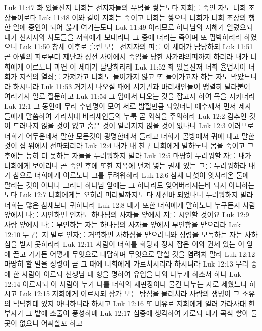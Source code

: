 Luk 11:47  화 있을진저 너희는 선지자들의 무덤을 쌓는도다 저희를 죽인 자도 너희 조상들이로다
Luk 11:48  이와 같이 저희는 죽이고 너희는 쌓으니 너희가 너희 조상의 행한 일에 증인이 되어 옳게 여기는도다
Luk 11:49  이러므로 하나님의 지혜가 일렀으되 내가 선지자와 사도들을 저희에게 보내리니 그 중에 더러는 죽이며 또 핍박하리라 하였으니
Luk 11:50  창세 이후로 흘린 모든 선지자의 피를 이 세대가 담당하되
Luk 11:51  곧 아벨의 피로부터 제단과 성전 사이에서 죽임을 당한 사가랴의피까지 하리라 내가 너희에게 이르노니 과연 이 세대가 담당하리라
Luk 11:52  화 있을진저 너희 율법사여 너희가 지식의 열쇠를 가져가고 너희도 들어가지 않고 또 들어가고자 하는 자도 막았느니라 하시니라
Luk 11:53  거기서 나오실 때에 서기관과 바리새인들이 맹렬히 달라붙어 여러가지 일로 힐문하고
Luk 11:54  그 입에서 나오는 것을 잡고자 하여 목을 지키더라
Luk 12:1  그 동안에 무리 수만명이 모여 서로 밟힐만큼 되었더니 예수께서 먼저 제자들에게 말씀하여 가라사대 바리새인들의 누룩 곧 외식을 주의하라
Luk 12:2  감추인 것이 드러나지 않을 것이 없고 숨은 것이 알려지지 않을 것이 없나니
Luk 12:3  이러므로 너희가 어두운데서 말한 모든것이 광명한데서 들리고 너희가 골방에서 귀에 대고 말한 것이 집 위에서 전파되리라
Luk 12:4  내가 내 친구 너희에게 말하노니 몸을 죽이고 그 후에는 능히 더 못하는 자들을 두려워하지 말라
Luk 12:5  마땅히 두려워할 자를 내가 너희에게 보이리니 곧 죽인 후에 또한 지옥에 던져 넣는 권세 있는 그를 두려워하라 내가 참으로 너희에게 이르노니 그를 두려워하라
Luk 12:6  참새 다섯이 앗사리온 둘에 팔리는 것이 아니냐 그러나 하나님 앞에는 그 하나라도 잊어버리시는바 되지 아니하는도다
Luk 12:7  너희에게는 오히려 머리털까지도 다 세신바 되었나니 두려워하지 말라 너희는 많은 참새보다 귀하니라
Luk 12:8  내가 또한 너희에게 말하노니 누구든지 사람 앞에서 나를 시인하면 인자도 하나님의 사자들 앞에서 저를 시인할 것이요
Luk 12:9  사람 앞에서 나를 부인하는 자는 하나님의 사자들 앞에서 부인함을 받으리라
Luk 12:10  누구든지 말로 인자를 거역하면 사하심을 받으려니와 성령을 모독하는 자는 사하심을 받지 못하리라
Luk 12:11  사람이 너희를 회당과 정사 잡은 이와 권세 있는 이 앞에 끌고 가거든 어떻게 무엇으로 대답하며 무엇으로 말할 것을 염려치 말라
Luk 12:12  마땅히 할 말을 성령이 곧 그 때에 너희에게 가르치시리라 하시니라
Luk 12:13  무리 중에 한 사람이 이르되 선생님 내 형을 명하여 유업을 나와 나누게 하소서 하니
Luk 12:14  이르시되 이 사람아 누가 나를 너희의 재판장이나 물건 나누는 자로 세웠느냐 하시고
Luk 12:15  저희에게 이르시되 삼가 모든 탐심을 물리치라 사람의 생명이 그 소유의 넉넉한데 있지 아니하니라 하시고
Luk 12:16  또 비유로 저희에게 일러 가라사대 한 부자가 그 밭에 소출이 풍성하매
Luk 12:17  심중에 생각하여 가로되 내가 곡식 쌓아 둘 곳이 없으니 어찌할꼬 하고
